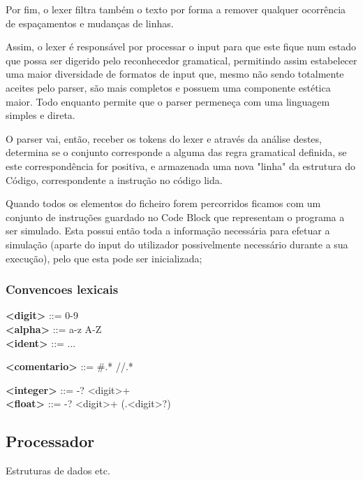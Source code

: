 \documentclass{report}
\begin{document}
Por fim, o lexer filtra também o texto por forma a remover qualquer ocorrência de espaçamentos e mudanças de linhas.

Assim, o lexer é responsável por processar o input para que este fique num estado que possa ser digerido pelo reconhecedor gramatical,
permitindo assim estabelecer uma maior diversidade de formatos de input que, mesmo não sendo totalmente aceites pelo
parser, são mais completos e possuem uma componente estética maior. Todo enquanto permite que o parser permeneça com
uma linguagem simples e direta.

O parser vai, então, receber os tokens do lexer e através da análise destes, determina se o conjunto
corresponde a alguma das regra gramatical definida, se este correspondência for positiva, e armazenada
uma nova "linha" da estrutura do Código, correspondente a instrução no código lida.

Quando todos os elementos do ficheiro forem percorridos ficamos com um conjunto de instruções guardado no Code Block que
representam o programa a ser simulado. Esta possui então toda a informação necessária para
efetuar a simulação (aparte do input do utilizador possivelmente necessário
durante a sua execução), pelo que esta pode ser inicializada;







\subsubsection{Convencoes lexicais}

\null\quad \textbf{\textless digit\textgreater}  ::= 0-9\\
\null\quad \textbf{\textless alpha\textgreater} ::= a-z \textvertline\space A-Z\\
\null\quad \textbf{\textless ident\textgreater} ::= ...

\null\quad \textbf{\textless comentario\textgreater} ::= \#.* \textvertline \space //\textspace\space.*

\null\quad \textbf{\textless integer\textgreater} ::= -? \textless digit\textgreater + \\
\null\quad \textbf{\textless float\textgreater} ::= -? \textless digit\textgreater + (.\textless digit\textgreater *?)\\

\subsection{Processador}
\quad Estruturas de dados etc.
\end{document}
